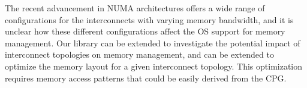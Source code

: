  The recent advancement in NUMA architectures offers a wide range of configurations for the interconnects with varying memory bandwidth, and  it is unclear how these different configurations affect the OS support for memory management. Our library can be extended to investigate the potential impact of interconnect topologies on memory management, and can be extended to  optimize the memory layout for a given interconnect topology. This optimization requires memory access patterns that could be easily derived from the CPG.


